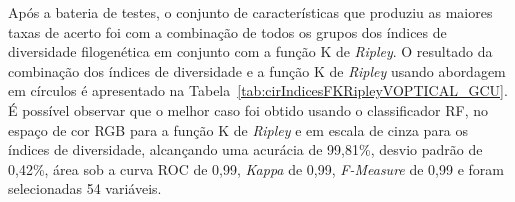 Após a bateria de testes, o conjunto de características que produziu as maiores taxas de acerto foi com a combinação de todos os grupos dos índices de diversidade filogenética em conjunto com a função K de \textit{Ripley}. O resultado da combinação dos índices de diversidade e a função K de \textit{Ripley} usando abordagem em círculos é apresentado na Tabela~\ref{tab:cirIndicesFKRipleyVOPTICAL_GCU}. É possível observar que o melhor caso foi obtido usando o classificador RF, no espaço de cor RGB para a função K de \textit{Ripley} e em escala de cinza para os índices de diversidade, alcançando uma acurácia de 99,81\%, desvio padrão de 0,42\%, área sob a curva ROC de 0,99, \textit{Kappa} de 0,99, \textit{F-Measure} de 0,99 e foram selecionadas 54 variáveis.

\begin{table}[!ht]
\centering
\onehalfspacing
\caption{Resultados produzidos sobre a base VOPTICAL\_GCU, combinando todos os grupos de índices de diversidade filogenética e a função K de \textit{Ripley} usando a abordagem em anéis.}
\label{tab:aneisIndicesFKRipleyVOPTICAL_GCU}
\end{table}
